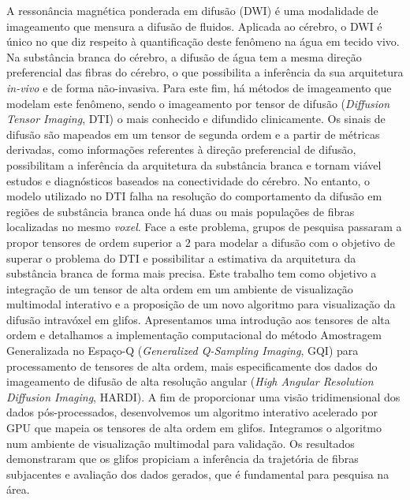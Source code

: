 \documentclass[
    12pt,                %
    oneside,            %
    a4paper,            %
    english,            %
    french,                %
    spanish,            %
    brazil                %
    ]{abntex2}
\begin{document}


\setlength{\absparsep}{18pt} %
\begin{resumo}

A ressonância magnética ponderada em difusão (DWI) é uma modalidade de imageamento que mensura a difusão de fluidos. Aplicada ao cérebro, o DWI é único no que diz respeito à quantificação deste fenômeno na água em tecido vivo. Na substância branca do cérebro, a difusão de água tem a mesma direção preferencial das fibras do cérebro, o que possibilita a inferência da sua arquitetura \textit{in-vivo} e de forma não-invasiva. Para este fim, há métodos de imageamento que modelam este fenômeno, sendo o imageamento por tensor de difusão (\textit{Diffusion Tensor Imaging}, DTI) o mais conhecido e difundido clinicamente. Os sinais de difusão são mapeados em um tensor de segunda ordem e a partir de métricas derivadas, como informações referentes à direção preferencial de difusão, possibilitam a inferência da arquitetura da substância branca e tornam viável estudos e diagnósticos baseados na conectividade do cérebro. No entanto, o modelo utilizado no DTI falha na resolução do comportamento da difusão em regiões de substância branca onde há duas ou mais populações de fibras localizadas no mesmo \textit{voxel}. Face a este problema, grupos de pesquisa passaram a propor tensores de ordem superior a 2 para modelar a difusão com o objetivo de superar o problema do DTI e possibilitar a estimativa da arquitetura da substância branca de forma mais precisa. Este trabalho tem como objetivo a integração de um tensor de alta ordem em um ambiente de visualização multimodal interativo e a proposição de um novo algoritmo para visualização da difusão intravóxel em glifos. Apresentamos uma introdução aos tensores de alta ordem  e detalhamos a implementação computacional do método Amostragem Generalizada no Espaço-Q (\textit{Generalized Q-Sampling Imaging}, GQI) para processamento de tensores de alta ordem, mais especificamente dos dados do imageamento de difusão de alta resolução angular (\textit{High Angular Resolution Diffusion Imaging}, HARDI). A fim de proporcionar uma visão tridimensional dos dados pós-processados, desenvolvemos um algoritmo interativo acelerado por GPU que mapeia os tensores de alta ordem em glifos. Integramos o algoritmo num ambiente de visualização multimodal para validação. Os resultados demonstraram que os glifos propiciam a inferência da trajetória de fibras subjacentes e avaliação dos dados gerados, que é fundamental para pesquisa na área.



\end{resumo}
\end{document}
